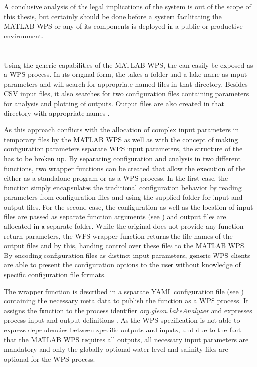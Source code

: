 		A conclusive analysis of the legal implications of the system is out of the scope of this thesis, but certainly should be done before a system facilitating the MATLAB WPS or any of its components is deployed in a public or productive environment.
	\section{\la}
		Using the generic capabilities of the MATLAB WPS, the \la can easily be exposed as a \ac{WPS} process. In its original form, the \la takes a folder and a lake name as input parameters and will search for appropriate named files in that directory. Besides CSV input files, it also searches for two configuration files containing parameters for analysis and plotting of outputs. Output files are also created in that directory with appropriate names \citep{lamanual}.

		As this approach conflicts with the allocation of complex input parameters in temporary files by the MATLAB WPS as well as with the concept of making configuration parameters separate \ac{WPS} input parameters, the structure of the \la has to be broken up. By separating configuration and analysis in two different functions, two wrapper functions can be created that allow the execution of the \la either as a standalone program or as a WPS process. In the first case, the function simply encapsulates the traditional configuration behavior by reading parameters from configuration files and using the supplied folder for input and output files. For the second case, the configuration as well as the location of input files are passed as separate function arguments (see ) and output files are allocated in a separate folder. While the original \la does not provide any function return parameters, the WPS wrapper function returns the file names of the output files and by this, handing control over these files to the MATLAB WPS. By encoding configuration files as distinct input parameters, generic WPS clients are able to present the configuration options to the user without knowledge of specific configuration file formats.

		The wrapper function is described in a separate YAML configuration file (see ) containing the necessary meta data to publish the function as a WPS process. It assigns the function to the process identifier \emph{org.gleon.LakeAnalyzer} and expresses process input and output definitions \citep[taken from the LakeAnalyzer user manual,][]{lamanual}. As the WPS specification is not able to express dependencies between specific outputs and inputs, and due to the fact that the MATLAB WPS requires all outputs, all necessary input parameters are mandatory and only the globally optional water level and salinity files are optional for the WPS process.


